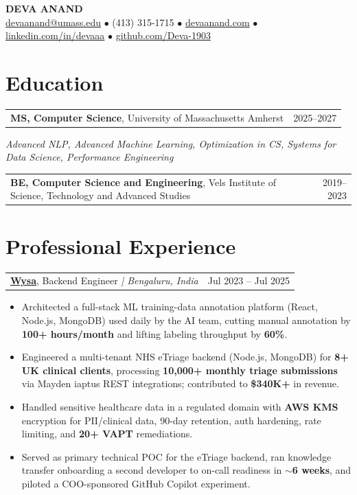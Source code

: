 \documentclass[letterpaper,11pt]{article}
\makeatletter
\newcommand{\eduItem}[3]{%
  \begin{tabular*}{\textwidth}{@{}l@{\extracolsep{\fill}}r@{}}
    \textbf{#1}, #2 & #3 \\
  \end{tabular*}\par
}
\newcommand{\expItem}[4]{%
  \vspace{3pt}
  \begin{tabular*}{\textwidth}{@{}l@{\extracolsep{\fill}}r@{}}
    \textbf{#1}, #2 \textit{| #3} & #4 \\
  \end{tabular*}\par\vspace{-2pt}
}
\makeatother
\begin{document}
\begin{center}
    {\fontsize{18}{20}\selectfont\bfseries DEVA ANAND}\\ \vspace{3pt}
    {\small
    \href{mailto:devaanand@umass.edu}{devaanand@umass.edu}
    \enspace$\bullet$\enspace
    (413) 315-1715
    \enspace$\bullet$\enspace
    \href{https://devaanand.com}{devaanand.com}
    \enspace$\bullet$\enspace
    \href{https://linkedin.com/in/devaaa/}{linkedin.com/in/devaaa}
    \enspace$\bullet$\enspace
    \href{https://github.com/Deva-1903}{github.com/Deva-1903}}
\end{center}
\vspace{-6pt}

\section{Education}
\eduItem{MS, Computer Science}{University of Massachusetts Amherst}{2025--2027}
{\small\textit{Advanced NLP, Advanced Machine Learning, Optimization in CS, Systems for Data Science, Performance Engineering}}\par
\vspace{3pt}
\eduItem{BE, Computer Science and Engineering}{Vels Institute of Science, Technology and Advanced Studies}{2019--2023}

\section{Professional Experience}

\expItem{\href{https://www.wysa.io}{Wysa}}{Backend Engineer}{Bengaluru, India}{Jul 2023 -- Jul 2025}
\begin{itemize}
  \item Architected a full-stack ML training-data annotation platform (React, Node.js, MongoDB) used daily by the AI team, cutting manual annotation by \textbf{100+ hours/month} and lifting labeling throughput by \textbf{60\%}.
  \item Engineered a multi-tenant NHS eTriage backend (Node.js, MongoDB) for \textbf{8+ UK clinical clients}, processing \textbf{10{,}000+ monthly triage submissions} via Mayden iaptus REST integrations; contributed to \textbf{\$340K+} in revenue.
  \item Handled sensitive healthcare data in a regulated domain with \textbf{AWS KMS} encryption for PII/clinical data, 90-day retention, auth hardening, rate limiting, and \textbf{20+ VAPT} remediations.
  \item Served as primary technical POC for the eTriage backend, ran knowledge transfer onboarding a second developer to on-call readiness in \textbf{$\sim$6 weeks}, and piloted a COO-sponsored GitHub Copilot experiment.
\end{itemize}
\end{document}
